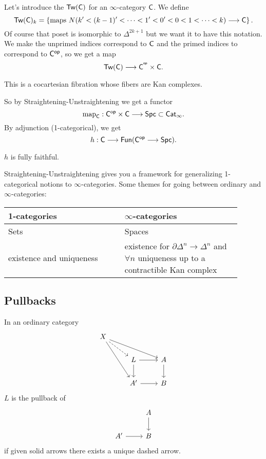 Let's introduce the  $\mathsf{Tw}(\mathsf{C})$ for an $\infty$-category $\mathsf{C}$. We define
\[
	\cat{Tw}(\C)_k = \left\{ \text{maps }N(k'<(k-1)'<\dots<1'<0'<0<1<\dots<k)\to \C \right\} .
\] 
Of course that poset is isomorphic to $\Delta^{2k+1}$ but we want it to have this notation. We make the unprimed indices correspond to $\mathsf{C}$ and the primed indices to correspond to $\mathsf{C}^\mathsf{op}$, so we get a map
\[
	\cat{Tw}(\C) \to  \C^{\op}\times \C.
\] 
\begin{lemma}
	This is a cocartesian fibration whose fibers are Kan complexes.
\end{lemma}
So by Straightening-Unstraightening we get a functor
\[
	\map_\C : \C\op\times \C \to \cat{Spc} \subset \cat{Cat}_\infty.
\] 
By adjunction (1-categorical), we get
\[
	h:\C \to \cat{Fun}(\cat{C}\op\to \cat{Spc}).
\] 
\begin{theorem}
	$h$ is fully faithful.
\end{theorem}
\begin{remark}
	Straightening-Unstraightening gives you a framework for generalizing 1-categorical notions to $\infty$-categories. Some themes for going between ordinary and $\infty$-categories:
	\begin{table}[h]
		\centering
		\label{tab:themes}
		\begin{tabular}{p{0.45\linewidth} | p{0.45\linewidth}}
		1-categories & $\infty$-categories \\ \hline
		Sets & Spaces \\
		existence and uniqueness & existence for $\partial \Delta^{n}\to \Delta^{n}$ and $\forall n$ uniqueness up to a contractible Kan complex
		\end{tabular}
	\end{table}
\end{remark}

\subsection{Pullbacks}
In an ordinary category 
\[
\begin{tikzcd}
	X \ar[dr,dashed] \ar[drr] \ar[ddr] \\
	& L \ar[r] \ar[d] & A \ar[d] \\
	& A' \ar[r] & B
\end{tikzcd}
\] 
$L$ is the pullback of
\[
\begin{tikzcd}
	& A \ar[d] \\
	A' \ar[r] & B
\end{tikzcd}
\] 
if given solid arrows there exists a unique dashed arrow. 

